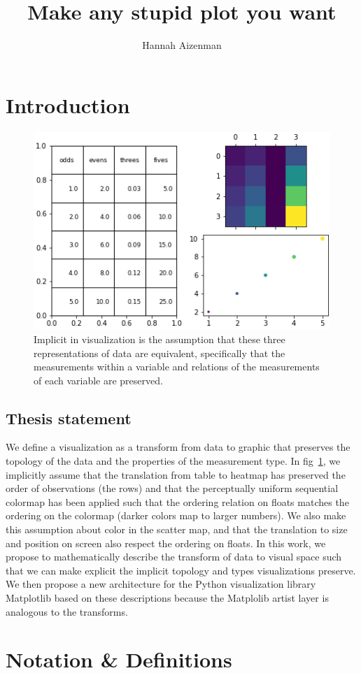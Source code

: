 \documentclass[letterpaper,onecolumn,titlepage]{Ythesis}
\title{Make any stupid plot you want}
\author{Hannah Aizenman}
\begin{document}
\makefrontmatter

\section{Introduction}
\label{sec:introduction}
\begin{figure}
    \includegraphics[width=.5\textwidth]{figures/intro/viz_same.png}
    \caption[]{Implicit in visualization is the assumption that these three representations of data are equivalent, specifically that the measurements within a variable and relations of the measurements of each variable are preserved. }
    \label{fig:viz_same}
\end{figure}

\subsection{Thesis statement}
We define a visualization as a transform from data to graphic that preserves the topology of the data and the properties of the measurement type. In fig~\ref{fig:viz_same}, we implicitly assume that the translation from table to heatmap has preserved the order of observations (the rows) and that the perceptually uniform sequential colormap has been applied such that the ordering relation on floats matches the ordering on the colormap (darker colors map to larger numbers). We also make this assumption about color in the scatter map, and that the translation to size and position on screen also respect the ordering on floats. In this work, we propose to mathematically describe the transform of data to visual space such that we can make explicit the implicit topology and types visualizations preserve. We then propose a new architecture for the Python visualization library Matplotlib \cite{hunterMatplotlib2DGraphics2007} based on these descriptions because the Matplolib artist layer is analogous to the transforms. 


\section{Notation \& Definitions}
\end{document}
